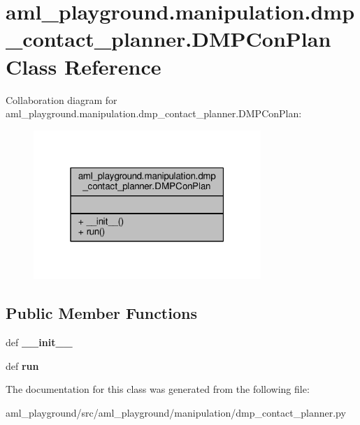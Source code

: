 \hypertarget{classaml__playground_1_1manipulation_1_1dmp__contact__planner_1_1_d_m_p_con_plan}{\section{aml\-\_\-playground.\-manipulation.\-dmp\-\_\-contact\-\_\-planner.\-D\-M\-P\-Con\-Plan Class Reference}
\label{classaml__playground_1_1manipulation_1_1dmp__contact__planner_1_1_d_m_p_con_plan}
}


Collaboration diagram for aml\-\_\-playground.\-manipulation.\-dmp\-\_\-contact\-\_\-planner.\-D\-M\-P\-Con\-Plan\-:
\nopagebreak
\begin{figure}[H]
\begin{center}
\leavevmode
\includegraphics[width=244pt]{classaml__playground_1_1manipulation_1_1dmp__contact__planner_1_1_d_m_p_con_plan__coll__graph}
\end{center}
\end{figure}
\subsection*{Public Member Functions}
\begin{DoxyCompactItemize}
\item 
\hypertarget{classaml__playground_1_1manipulation_1_1dmp__contact__planner_1_1_d_m_p_con_plan_aa9f4c0a28672cccb2b004e7b034d1c21}{def {\bfseries \-\_\-\-\_\-init\-\_\-\-\_\-}}\label{classaml__playground_1_1manipulation_1_1dmp__contact__planner_1_1_d_m_p_con_plan_aa9f4c0a28672cccb2b004e7b034d1c21}

\item 
\hypertarget{classaml__playground_1_1manipulation_1_1dmp__contact__planner_1_1_d_m_p_con_plan_a0310c9593a975c9cf12f9e873d93cce9}{def {\bfseries run}}\label{classaml__playground_1_1manipulation_1_1dmp__contact__planner_1_1_d_m_p_con_plan_a0310c9593a975c9cf12f9e873d93cce9}

\end{DoxyCompactItemize}


The documentation for this class was generated from the following file\-:\begin{DoxyCompactItemize}
\item 
aml\-\_\-playground/src/aml\-\_\-playground/manipulation/dmp\-\_\-contact\-\_\-planner.\-py\end{DoxyCompactItemize}
